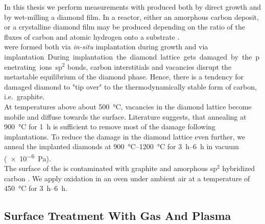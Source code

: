 				In this thesis we perform measurements with \nds produced both by direct \CVD growth and by wet-milling a \CVD diamond film.
				In a \cvd reactor, either an amorphous carbon deposit, or a crystalline diamond film may be produced depending on the ratio of the fluxes of carbon and atomic hydrogen onto a substrate \cite{Ford1995,Olson1993}. 
				\\
				\sivs were formed both via \textit{in-situ} implantation during \CVD growth and via \si implantation.
				During \si implantation the diamond lattice gets damaged by the penetrating ions.
				sp$^2$ bonds, carbon interstitials and vacancies disrupt the metastable equilibrium of the diamond phase. 
				Hence, there is a tendency for damaged diamond to "tip over" to the thermodynamically stable form of carbon, i.e.\ graphite.
				\\
				At temperatures above about \SI{500}{\celsius}, vacancies in the diamond lattice become mobile and diffuse towards the surface\cite{Dresselhaus1992}.
				Literature suggests, that annealing at \SI{900}{\celsius} for \SI{1}{\hour} is sufficient to remove most of the damage following implantations.
				To reduce the damage in the diamond lattice even further, we anneal the implanted diamonds at \SIrange{900}{1200}{\celsius} for \SIrange{3}{6}{h} in vacuum (\SI{e-6}{Pa}).
				\\
				The surface of the \nds is contaminated with graphite and amorphous sp$^2$ hybridized carbon . We apply oxidation in an oven under ambient air at a temperature of \SI{450}{\celsius} for \SIrange{3}{6}{h}.

			\subsection{Surface Treatment With Gas And Plasma}\label{subsection::plasma}

